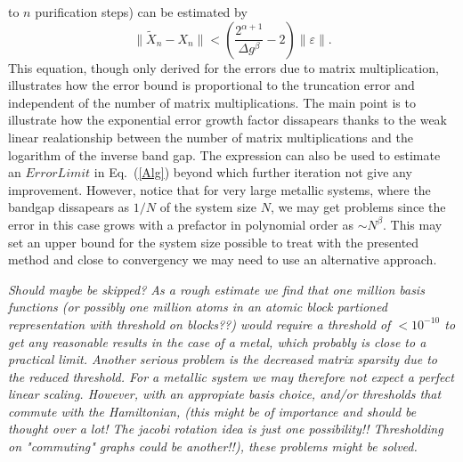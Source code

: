 to $n$ purification steps) can be estimated by
\begin{equation}
\| {\widetilde X}_n - X_n \| < 
\left( \frac{2^{\alpha+1}}{\Delta g ^{\beta}} - 2 \right) \|\varepsilon\|.
\end{equation}
This equation, though only derived for the errors due to matrix multiplication, 
illustrates how the error bound is proportional to the truncation error and
independent of the number of matrix multiplications. The main
point is to illustrate how the exponential error growth factor dissapears
thanks to the weak linear realationship between the number
of matrix multiplications and the logarithm of the inverse band gap.
The expression can also be used to estimate an $ErrorLimit$ in Eq.\ (\ref{Alg})
beyond which further iteration not give any improvement.
However, notice that for very large metallic systems, where the
bandgap dissapears as $1/N$ of the system size $N$, we 
may get problems since the error in this case grows with 
a prefactor in polynomial order as $\sim N^{\beta}$.
This may set an upper bound for the system size possible to
treat with the presented method and close to convergency we may
need to use an alternative approach. 

{\it Should maybe be skipped? As a rough estimate we
find that one million basis functions (or possibly one million 
atoms in an atomic block partioned representation with threshold on blocks??)
would require a threshold of $< 10^{-10}$ to get any 
reasonable results in the case of a metal, which probably 
is close to a practical limit. Another serious problem is
the decreased matrix sparsity due to the reduced threshold.
For a metallic system we may therefore not expect a perfect
linear scaling. However, with an appropiate basis choice,
and/or thresholds that commute with the Hamiltonian,
(this might be of importance and should be thought over a lot!
The jacobi rotation idea is just one possibility!!
Thresholding on "commuting" graphs could be another!!),
these problems might be solved.}

